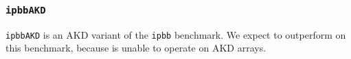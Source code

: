 \subsubsection{\tt ipbbAKD}
\label{benchmarkipbbAKD}

{\tt ipbbAKD} is an AKD variant of the {\tt ipbb} benchmark.
We expect \awlf to outperform \wlf on this benchmark, because
\wlf is unable to operate on AKD arrays.
